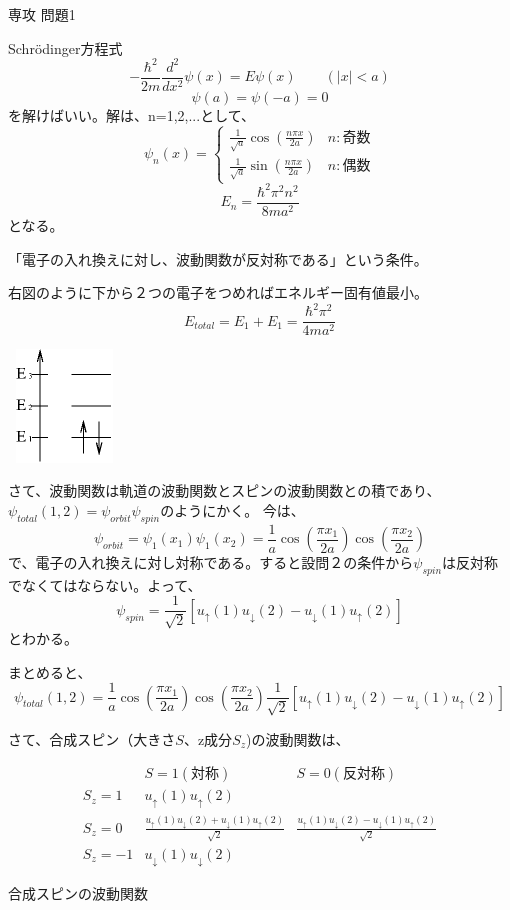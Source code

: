 \documentclass[fleqn]{jbook}
\begin{document}
\begin{answer}{専攻 問題1}{}

\begin{subanswers}
\SubAnswer

Schr\"odinger方程式
\[
-\frac{\hbar^{2}}{2m}\frac{d^{2}}{dx^{2}}\psi(x) = E\psi(x) \qquad (|x|<a)
\]
\[
\psi(a)=\psi(-a)=0
\]
を解けばいい。解は、n=1,2,...として、
\[
\psi_{n}(x)=
\left\{
	\begin{array}{rl}
	\frac{1}{\sqrt{a}}\cos(\frac{n{\pi}x}{2a}) & n:奇数 \\
	\frac{1}{\sqrt{a}}\sin(\frac{n{\pi}x}{2a}) & n:偶数
	\end{array}
\right.
\]
\[
E_{n}=\frac{\hbar^{2}\pi^{2}n^{2}}{8ma^{2}}
\]
となる。

\SubAnswer

「電子の入れ換えに対し、波動関数が反対称である」という条件。


\SubAnswer

 \parbox[t]{100mm}{
 右図のように下から２つの電子をつめればエネルギー固有値最小。
 \[
 E_{total}=E_{1}+E_{1}=\frac{\hbar^{2}\pi^{2}}{4ma^{2}}
 \]
 }
 \parbox[t]{50mm}{
 \begin{center}
  \includegraphics[clip,height=30mm,width=30mm]{1998phy1-1.eps}
 \end{center}
 }

 
さて、波動関数は軌道の波動関数とスピンの波動関数との積であり、$\psi_{total}(1,2)=\psi_{orbit}\psi_{spin}$のようにかく。
今は、
\[
\psi_{orbit}=\psi_{1}(x_{1})\psi_{1}(x_{2})=\frac{1}{a}\cos\left(\frac{{\pi}x_{1}}{2a}\right)\cos\left(\frac{{\pi}x_{2}}{2a}\right)
\]
で、電子の入れ換えに対し対称である。すると設問２の条件から$\psi_{spin}$は反対称でなくてはならない。よって、
\[
\psi_{spin}=\frac{1}{\sqrt{2}}[u_{\uparrow}(1)u_{\downarrow}(2)-u_{\downarrow}(1)u_{\uparrow}(2)]
\]
とわかる。

まとめると、
\[
\psi_{total}(1,2)=\frac{1}{a}\cos\left(\frac{{\pi}x_{1}}{2a}\right)\cos\left(\frac{{\pi}x_{2}}{2a}\right)\frac{1}{\sqrt{2}}[u_{\uparrow}(1)u_{\downarrow}(2)-u_{\downarrow}(1)u_{\uparrow}(2)]
\]

さて、合成スピン（大きさ$S$、z成分$S_{z}$)の波動関数は、

\begin{table}[h]
\[
	\begin{array}{lcc}
	 & S=1(対称) & S=0(反対称) \\
	S_{z}=1 & u_{\uparrow}(1)u_{\uparrow}(2) & \\
	S_{z}=0 & \frac{u_{\uparrow}(1)u_{\downarrow}(2)+u_{\downarrow}(1)u_{\uparrow}(2)}{\sqrt{2}} &\frac{u_{\uparrow}(1)u_{\downarrow}(2)-u_{\downarrow}(1)u_{\uparrow}(2)}{\sqrt{2}} \\
	S_{z}=-1 & u_{\downarrow}(1)u_{\downarrow}(2) &
	\end{array}
\]
\caption{合成スピンの波動関数}
\end{table}


\end{subanswers}
\end{answer}
\end{document}
